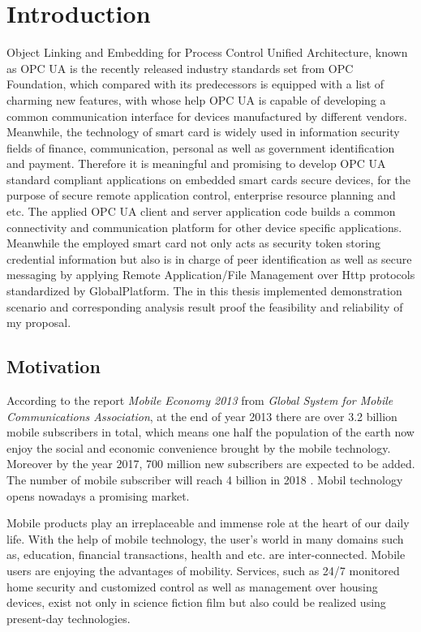 \chapter{Introduction}\label{secIntroduction}

Object Linking and Embedding for Process Control Unified Architecture, known as OPC UA is the recently released industry standards set from OPC Foundation, which compared with its predecessors is equipped with a list of charming new features, with whose help OPC UA is capable of developing a common communication interface for devices manufactured by different vendors. Meanwhile, the technology of smart card is widely used in information security fields of finance, communication, personal as well as government identification and payment. Therefore it is meaningful and promising to develop OPC UA standard compliant applications on embedded smart cards secure devices, for the purpose of secure remote application    control, enterprise resource planning and etc. The applied OPC UA client and server application code builds a common connectivity and communication platform for other device specific applications. Meanwhile the employed smart card not only acts as security token storing credential information but also is in charge of peer identification as well as secure messaging by applying Remote Application/File Management over Http protocols standardized by GlobalPlatform. The in this thesis implemented demonstration scenario and corresponding analysis result proof the feasibility and reliability of my proposal. 

\section{Motivation}\label{secMotivation}

According to the report \emph{Mobile Economy 2013} from \emph{Global System for Mobile Communications Association}, at the end of year 2013 there are over 3.2 billion mobile subscribers in total, which means one half the population of the earth now enjoy the social and economic convenience brought by the mobile technology. Moreover by the year 2017, 700 million new subscribers are expected to be added. The number of mobile subscriber will reach 4 billion in 2018 \cite{last}. Mobil technology opens nowadays a promising market.

Mobile products play an irreplaceable and immense role at the heart of our daily life. With the help of mobile technology, the user's world in many domains such as, education, financial transactions, health and etc. are inter-connected. Mobile users are enjoying the advantages of mobility. Services, such as 24/7 monitored home security and customized control as well as management over housing devices, exist not only in science fiction film but also could be realized using present-day technologies.

